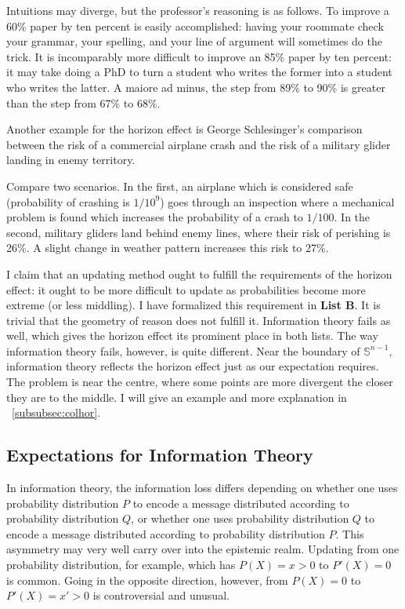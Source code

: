 \documentclass[12pt]{article}
\begin{document}
Intuitions may diverge, but the professor's reasoning is as follows.
To improve a 60\% paper by ten percent is easily accomplished: having
your roommate check your grammar, your spelling, and your line of
argument will sometimes do the trick. It is incomparably more
difficult to improve an 85\% paper by ten percent: it may take doing a
PhD to turn a student who writes the former into a student who writes
the latter. A maiore ad minus, the step from 89\% to 90\% is greater
than the step from 67\% to 68\%.

Another example for the horizon effect is George Schlesinger's
comparison between the risk of a commercial airplane crash and the
risk of a military glider landing in enemy territory.

\begin{example}
  \label{ex:schlesinger}
  Compare two scenarios. In the first, an airplane which is considered
  safe (probability of crashing is $1/10^{9}$) goes through an
  inspection where a mechanical problem is found which increases the
  probability of a crash to $1/100$. In the second, military gliders
  land behind enemy lines, where their risk of perishing is 26\%. A
  slight change in weather pattern increases this risk to 27\%.
\end{example}

I claim that an updating method ought to fulfill the requirements of
the horizon effect: it ought to be more difficult to update as
probabilities become more extreme (or less middling). I have
formalized this requirement in \textbf{List B}. It is trivial that the
geometry of reason does not fulfill it. Information theory fails as
well, which gives the horizon effect its prominent place in both
lists. The way information theory fails, however, is quite different.
Near the boundary of $\mathbb{S}^{n-1}$, information theory reflects
the horizon effect just as our expectation requires. The problem is
near the centre, where some points are more divergent the closer they
are to the middle. I will give an example and more explanation in
{\ubsection}~\ref{subsubsec:colhor}.

\subsection{Expectations for Information Theory}
\label{subsec:expinfth}

In information theory, the information loss differs depending on
whether one uses probability distribution $P$ to encode a message
distributed according to probability distribution $Q$, or whether one
uses probability distribution $Q$ to encode a message distributed
according to probability distribution $P$. This asymmetry may very
well carry over into the epistemic realm. Updating from one
probability distribution, for example, which has $P(X)=x>0$ to
$P'(X)=0$ is common. Going in the opposite direction, however, from
$P(X)=0$ to $P'(X)=x'>0$ is controversial and unusual.
\end{document}
